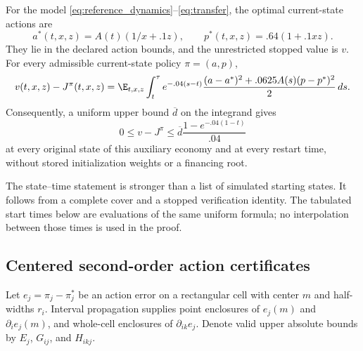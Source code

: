 \begin{theorem}\label{thm:reference}
For the model \eqref{eq:reference_dynamics}--\eqref{eq:transfer}, the optimal current-state actions are
\begin{equation}
 a^*(t,x,z)=A(t)(1/x+.1z),\qquad
 p^*(t,x,z)=.64(1+.1xz).\label{eq:reference_controls}
\end{equation}
They lie in the declared action bounds, and the unrestricted stopped value is $v$. For every admissible current-state policy $\pi=(a,p)$,
\begin{equation}
 v(t,x,z)-J^\pi(t,x,z)
 =\E_{t,x,z}\int_t^\tau e^{-.04(s-t)}
 \frac{(a-a^*)^2+.0625A(s)(p-p^*)^2}{2}\,ds.\label{eq:reference_regret}
\end{equation}
Consequently, a uniform upper bound $\overline d$ on the integrand gives
\begin{equation}
 0\leq v-J^\pi\leq \overline d\frac{1-e^{-.04(1-t)}}{.04}
 \label{eq:reference_certificate}
\end{equation}
at every original state of this auxiliary economy and at every restart time, without stored initialization weights or a financing root.
\end{theorem}
The state--time statement is stronger than a list of simulated starting states. It follows from a complete cover and a stopped verification identity. The tabulated start times below are evaluations of the same uniform formula; no interpolation between those times is used in the proof.

\subsection{Centered second-order action certificates}\label{sec:jets}
Let $e_j=\pi_j-\pi_j^*$ be an action error on a rectangular cell with center $m$ and half-widths $r_i$. Interval propagation supplies point enclosures of $e_j(m)$ and $\partial_i e_j(m)$, and whole-cell enclosures of $\partial_{ik}e_j$. Denote valid upper absolute bounds by $E_j$, $G_{ij}$, and $H_{ikj}$.

